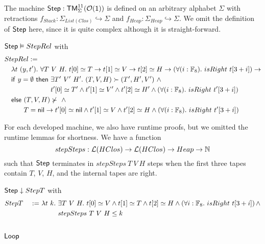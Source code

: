 The machine $\mathsf{Step} : \mathsf{TM}_\Sigma^{11}(\mathcal{O}(\mathsf{1}))$ is defined on an arbitrary alphabet $\Sigma$ with retractions
$f_{Stack} : \Sigma_{List(Clos)} \hookrightarrow \Sigma$ and $f_{Heap} : \Sigma_{Heap} \hookrightarrow \Sigma$.  We omit the definition of $\mathsf{Step}$
here, since it is quite complex although it is straight-forward.

\begin{lemma}
  \label{lem:Step_Realise}
  $\mathsf{Step} \mathrel{\vDash} StepRel$ with
  \begin{alignat*}{1}
    & StepRel := \\
    &\quad \lambda t~(y, t').~\forall T~V~H.~ t[0] \simeq T \rightarrow t[1] \simeq V \rightarrow t[2] \simeq H \rightarrow \left(\forall (i:\Fin_8).~isRight~t[3+i]\right) \rightarrow \\
    &\quad \MS{if}~y=\None~\MS{then}~\exists T'~V'~H'.~(T,V,H) \red (T',H',V') ~\land~ \\
    &\quad \phantom{\MS{if}~y=\None~\MS{then}}~ t'[0] \simeq T' \land t'[1] \simeq V' \land t'[2] \simeq H' \land \left(\forall (i:\Fin_8).~isRight~t'[3+i]\right) \\
    &\quad \MS{else}~ (T,V,H) \nred ~\land~ \\
    &\quad \phantom{\MS{else}}~T=\nil \rightarrow t'[0] \simeq \nil \land t'[1] \simeq V \land t'[2] \simeq H \land \left(\forall (i:\Fin_8).~isRight~t'[3+i]\right)
  \end{alignat*}
\end{lemma}

For each developed machine, we also have runtime proofs, but we omitted the runtime lemmas for shortness.  We have a function
\[
  stepSteps : \mathcal{L}(HClos) \rightarrow \mathcal{L}(HClos) \rightarrow Heap \rightarrow \mathbb{N}
\]
such that $\mathsf{Step}$ terminates in $stepSteps~T~V~H$ steps when the first three tapes contain $T$, $V$, $H$, and the internal tapes are right.
\begin{lemma}
  \label{lem:Step_Terminates}
  $\mathsf{Step} \mathrel{\downarrow} StepT$ with
  \begin{alignat*}{3}
    & StepT &~:=~& \lambda t~k.~\exists T~V~H.~t[0] \simeq V \land t[1] \simeq T \land t[2] \simeq H \land \left(\forall i:\mathbb{F}_8.~isRight~t[3+i]\right) \land \\
    &       &    & \phantom{\lambda t~k.}~stepSteps~T~V~H \leq k
  \end{alignat*}
\end{lemma}


\subsection{$\mathsf{Loop}$}
\label{sec:heap-Loop}

